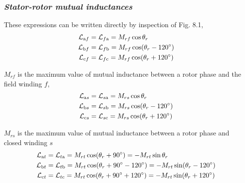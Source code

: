\documentclass[a4paper,numbers=noenddot,12pt]{scrbook}
\begin{document}
\subsubsection{\textit{Stator-rotor mutual inductances}} These expressions can be written directly by inspection of Fig. 8.1,
\begin{equation}
    \begin{aligned}
        \mathcal{L}_{\textup{a}f} & = \mathcal{L}_{f\textup{a}} = M_{rf} \cos \theta_r \\
        \mathcal{L}_{\textup{b}f} & = \mathcal{L}_{f\textup{b}} = M_{rf} \cos (\theta_r - 120^{\circ}) \\
        \mathcal{L}_{\textup{c}f} & = \mathcal{L}_{f\textup{c}} = M_{rf} \cos (\theta_r + 120^{\circ}) \\
    \end{aligned}
    \label{eq:Eq8.17}
\end{equation}

$M_{rf}$ is the maximum value of mutual inductance between a rotor phase and the field winding $f$,
\begin{equation}
    \begin{aligned}
        \mathcal{L}_{\textup{a}s} & = \mathcal{L}_{s\textup{a}} = M_{rs} \cos \theta_r \\
        \mathcal{L}_{\textup{b}s} & = \mathcal{L}_{s\textup{b}} = M_{rs} \cos (\theta_r - 120^{\circ}) \\
        \mathcal{L}_{\textup{c}s} & = \mathcal{L}_{s\textup{c}} = M_{rs} \cos (\theta_r + 120^{\circ}) \\
    \end{aligned}
    \label{eq:Eq8.18}
\end{equation}

$M_{rs}$ is the maximum value of mutual inductance between a rotor phase and closed winding $s$
\begin{equation}
    \begin{aligned}
        \mathcal{L}_{\textup{a}t} & = \mathcal{L}_{t\textup{a}} = M_{rt} \cos (\theta_r + 90^{\circ}) = -M_{rt} \sin \theta_r \\
        \mathcal{L}_{\textup{b}t} & = \mathcal{L}_{t\textup{b}} = M_{rt} \cos (\theta_r + 90^{\circ} - 120^{\circ}) =  -M_{rt} \sin (\theta_r - 120^{\circ}) \\
        \mathcal{L}_{\textup{c}t} & = \mathcal{L}_{t\textup{c}} = M_{rt} \cos (\theta_r + 90^{\circ} + 120^{\circ}) =  -M_{rt} \sin (\theta_r + 120^{\circ}) \\
    \end{aligned}
    \label{eq_Eq8.19}
\end{equation}
\end{document}
